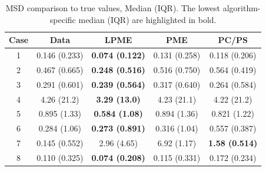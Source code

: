 \documentclass[11pt,reqno]{article}
\theoremstyle{definition}
\begin{document}
\begin{table}[h]
  \centering
  \begin{tabular}{|c c c c c|}
    \hline
    Case & Data & LPME & PME & PC/PS \\
    \hline
    1 & 0.146 (0.233) & {\bf 0.074 (0.122)} & 0.131 (0.258) & 0.118 (0.206) \\
    2 & 0.467 (0.665) & {\bf 0.248 (0.516)} & 0.516 (0.750) & 0.564 (0.419) \\
    3 & 0.291 (0.601) & {\bf 0.239 (0.564)} & 0.317 (0.640) & 0.264 (0.584) \\
    4 & 4.26 (21.2) & {\bf 3.29 (13.0)} & 4.23 (21.1) & 4.22 (21.2) \\
    5 & 0.895 (1.33) & {\bf 0.584 (1.08)} & 0.894 (1.36) & 0.821 (1.22) \\
    6 & 0.284 (1.06) & {\bf 0.273 (0.891)} & 0.316 (1.04) & 0.557 (0.387) \\
    7 & 0.145 (0.552) & 2.96 (4.65) & 6.92 (1.17) & {\bf 1.58 (0.514)} \\
    8 & 0.110 (0.325) & {\bf 0.074 (0.208)} & 0.115 (0.331) & 0.172 (0.234) \\
    \hline
  \end{tabular}
  \caption{MSD comparison to true values, Median (IQR). The lowest algorithm-specific median (IQR) are highlighted in bold.}
  \label{table:simulation_results_median}
\end{table}
\end{document}
